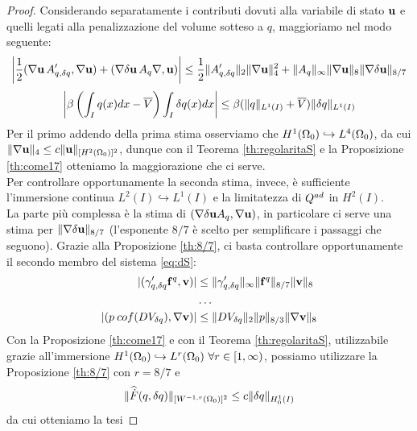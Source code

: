 \begin{proof}
	Considerando separatamente i contributi dovuti alla variabile di stato $\mathbf{u}$ e quelli legati alla penalizzazione del volume sotteso a $q$, maggioriamo nel modo seguente:
	$$ \left|\frac{1}{2}(\nabla\mathbf{u}\,A'_{q,{\delta q}},\nabla\mathbf{u}) + (\nabla\mathbf{\delta u}\,A_q\nabla,\mathbf{u})\right| \leq \frac{1}{2}\|A'_{q,{\delta q}}\|_2\|\nabla\mathbf{u}\|_4^2 + \|A_q\|_\infty\|\nabla\mathbf{u}\|_8\|\nabla\mathbf{\delta u}\|_{8/7} $$
	$$ \left|\beta\left(\int_I{q(x)dx}-\overline{V}\right)\int_I{{\delta q}(x)dx}\right| \leq \beta(\|q\|_{L^1(I)}+\overline{V})\|{\delta q}\|_{L^1(I)} $$
	Per il primo addendo della prima stima osserviamo che $H^1({\Omega_0})\hookrightarrow L^4({\Omega_0})$, da cui $\|\nabla\mathbf{u}\|_4\leq c\|\mathbf{u}\|_{[H^2({\Omega_0})]^2}$, dunque con il Teorema \ref{th:regolaritaS} e la Proposizione \ref{th:come17} otteniamo la maggiorazione che ci serve.\\
	Per controllare opportunamente la seconda stima, invece, è sufficiente l'immersione continua $L^2(I)\hookrightarrow L^1(I)$ e la limitatezza di $Q^{ad}$ in $H^2(I)$.\\
	La parte più complessa è la stima di $(\nabla\mathbf{\delta u} A_q,\nabla\mathbf{u})$, in particolare ci serve una stima per $\|\nabla\mathbf{\delta u}\|_{8/7}$ (l'esponente $8/7$ è scelto per semplificare i passaggi che seguono). Grazie alla Proposizione \ref{th:8/7}, ci basta controllare opportunamente il secondo membro del sistema \eqref{eq:dS}:
	\begin{equation*}\begin{split}
	|(\gamma'_{q,{\delta q}}\mathbf f^q,\mathbf{v})|&\leq \|\gamma'_{q,{\delta q}}\|_\infty\|\mathbf f^q\|_{8/7}\|\mathbf{v}\|_8\\
	&\dots\\
	|(p\:cof(DV_{\delta q}),\nabla\mathbf{v})|&\leq\|DV_{\delta q}\|_2\|p\|_{8/3}\|\nabla\mathbf{v}\|_8
	\end{split}\end{equation*}
	Con la Proposizione \ref{th:come17} e con il Teorema \ref{th:regolaritaS}, utilizzabile grazie all'immersione $H^1({\Omega_0})\hookrightarrow L^r({\Omega_0})\ \forall r\in[1,\infty)$, possiamo utilizzare la Proposizione \ref{th:8/7} con $r=8/7$ e
	$$\|\widehat{\dot{F}}(q,{\delta q})\|_{[W^{-1,r}({\Omega_0})]^2}\leq c\|{\delta q}\|_{H^1_0(I)}$$
	da cui otteniamo la tesi \qedhere
\end{proof}


